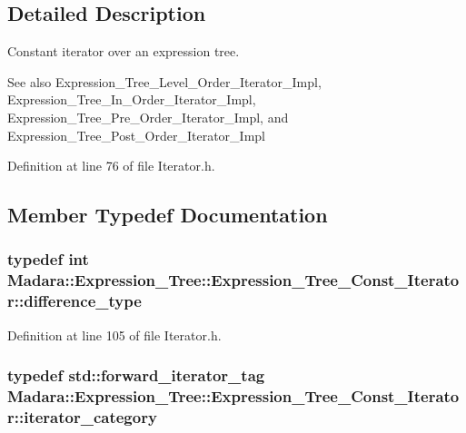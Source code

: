 \subsection{Detailed Description}
Constant iterator over an expression tree. \begin{DoxySeeAlso}{See also}
Expression\_\-Tree\_\-Level\_\-Order\_\-Iterator\_\-Impl, Expression\_\-Tree\_\-In\_\-Order\_\-Iterator\_\-Impl, Expression\_\-Tree\_\-Pre\_\-Order\_\-Iterator\_\-Impl, and Expression\_\-Tree\_\-Post\_\-Order\_\-Iterator\_\-Impl 
\end{DoxySeeAlso}


Definition at line 76 of file Iterator.h.



\subsection{Member Typedef Documentation}
\hypertarget{classMadara_1_1Expression__Tree_1_1Expression__Tree__Const__Iterator_a1071ab3eba30a4eba88c00e2ae0c2381}{
\subsubsection[{difference\_\-type}]{\setlength{\rightskip}{0pt plus 5cm}typedef int {\bf Madara::Expression\_\-Tree::Expression\_\-Tree\_\-Const\_\-Iterator::difference\_\-type}}}
\label{db/d5c/classMadara_1_1Expression__Tree_1_1Expression__Tree__Const__Iterator_a1071ab3eba30a4eba88c00e2ae0c2381}


Definition at line 105 of file Iterator.h.

\hypertarget{classMadara_1_1Expression__Tree_1_1Expression__Tree__Const__Iterator_ae653a4e600bab2c68c253caa1941693f}{
\subsubsection[{iterator\_\-category}]{\setlength{\rightskip}{0pt plus 5cm}typedef std::forward\_\-iterator\_\-tag {\bf Madara::Expression\_\-Tree::Expression\_\-Tree\_\-Const\_\-Iterator::iterator\_\-category}}}
\label{db/d5c/classMadara_1_1Expression__Tree_1_1Expression__Tree__Const__Iterator_ae653a4e600bab2c68c253caa1941693f}


